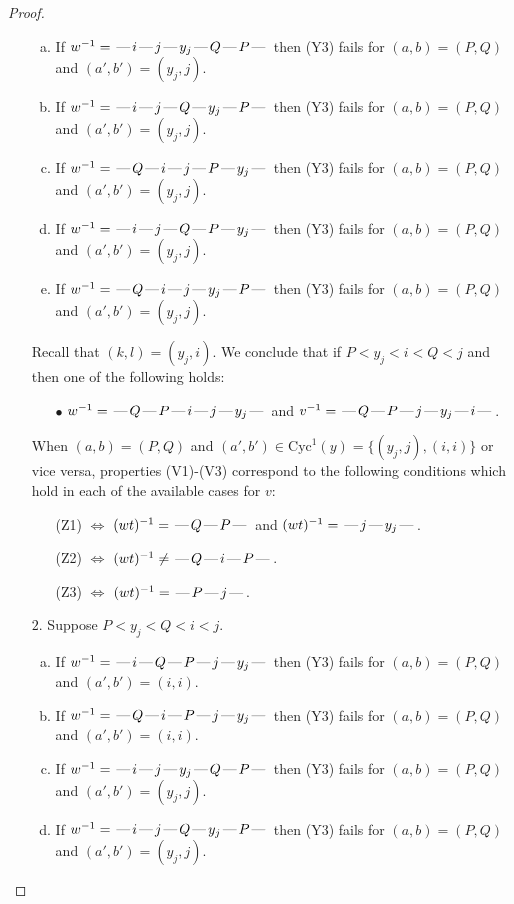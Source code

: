 \documentclass[10pt]{article}
\theoremstyle{definition}
\theoremstyle{definition}
\def\dash{\text{\hspace{0.5mm}---\hspace{0.5mm}}}
\def\Cyc{\mathrm{Cyc}}
\begin{document}
\begin{proof}
\begin{enumerate}
\begin{enumerate}[(a)]
\item If $w^{-1} = \dash i\dash j\dash y_j\dash Q\dash P\dash $ then (Y3) fails for $(a,b)=(P,Q)$ and $(a',b')=(y_j,j)$.
\item If $w^{-1} = \dash i\dash j\dash Q\dash y_j\dash P\dash $ then (Y3) fails for $(a,b)=(P,Q)$ and $(a',b')=(y_j,j)$.
\item If $w^{-1} = \dash Q\dash i\dash j\dash P\dash y_j\dash $ then (Y3) fails for $(a,b)=(P,Q)$ and $(a',b')=(y_j,j)$.
\item If $w^{-1} = \dash i\dash j\dash Q\dash P\dash y_j\dash $ then (Y3) fails for $(a,b)=(P,Q)$ and $(a',b')=(y_j,j)$.
\item If $w^{-1} = \dash Q\dash i\dash j\dash y_j\dash P\dash $ then (Y3) fails for $(a,b)=(P,Q)$ and $(a',b')=(y_j,j)$.
\end{enumerate}
Recall that $(k,l) = (y_j,i)$.
We conclude that if $P < y_j < i < Q < j$ and then one of the following holds:
\begin{enumerate}
\item[$\bullet$] $w^{-1} = \dash Q\dash P\dash i\dash j\dash y_j\dash $ and $v^{-1} = \dash Q\dash P\dash j\dash y_j\dash i\dash $.
\end{enumerate}
When $(a,b)= (P,Q)$ and $(a',b')\in \Cyc^1(y)=\{(y_j,j),(i,i)\}$ or vice versa,
properties (V1)-(V3) correspond to the following conditions which hold in
each of the available cases for $v$:
\begin{enumerate}
\item[](Z1) $\Leftrightarrow$ $(wt)^{-1} = \dash Q \dash P \dash$  and $(wt)^{-1} = \dash j \dash y_j \dash$.
\item[](Z2) $\Leftrightarrow$ $(wt)^{-1} \neq \dash Q \dash i \dash P \dash$.
\item[](Z3) $\Leftrightarrow$ $(wt)^{-1} = \dash P \dash j \dash$.
\end{enumerate}
\item[$2$.] Suppose $P < y_j < Q < i < j$.
\begin{enumerate}[(a)]
\item If $w^{-1} = \dash i\dash Q\dash P\dash j\dash y_j\dash $ then (Y3) fails for $(a,b)=(P,Q)$ and $(a',b')=(i,i)$.
\item If $w^{-1} = \dash Q\dash i\dash P\dash j\dash y_j\dash $ then (Y3) fails for $(a,b)=(P,Q)$ and $(a',b')=(i,i)$.
\item If $w^{-1} = \dash i\dash j\dash y_j\dash Q\dash P\dash $ then (Y3) fails for $(a,b)=(P,Q)$ and $(a',b')=(y_j,j)$.
\item If $w^{-1} = \dash i\dash j\dash Q\dash y_j\dash P\dash $ then (Y3) fails for $(a,b)=(P,Q)$ and $(a',b')=(y_j,j)$.

\end{enumerate}
\end{enumerate}
\end{proof}
\end{document}
